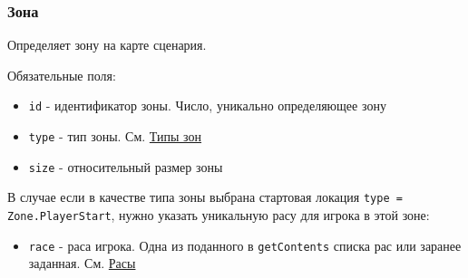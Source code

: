 \subsubsection{Зона}
\label{zone}
Определяет зону на карте сценария.

Обязательные поля:
\begin{itemize}
\item \texttt{id} - идентификатор зоны. Число, уникально определяющее зону
\item \texttt{type} - тип зоны. См. \hyperref[zoneTypes]{Типы зон}
\item \texttt{size} - относительный размер зоны
\end{itemize}

В случае если в качестве типа зоны выбрана стартовая локация \texttt{type = Zone.PlayerStart}, нужно указать уникальную расу для игрока в этой зоне:
\begin{itemize}
\item \texttt{race} - раса игрока. Одна из поданного в \texttt{getContents} списка рас или заранее заданная. См. \hyperref[raceTypes]{Расы}
\end{itemize}

